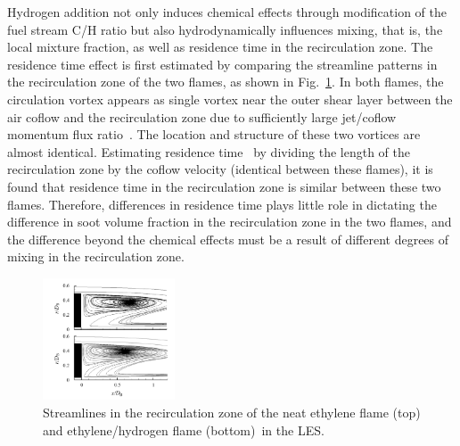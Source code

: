 \documentclass[review,3p,times]{elsarticle}
\begin{document}
  
Hydrogen addition not only induces chemical effects through modification of the fuel stream C/H ratio but also hydrodynamically influences mixing, that is, the local mixture fraction, as well as residence time in the recirculation zone.  The residence time effect is first estimated by comparing the streamline patterns in the recirculation zone of the two flames, as shown in Fig.~\ref{fig:streamline}.  In both flames, the circulation vortex appears as single vortex near the outer shear layer between the air coflow and the recirculation zone due to sufficiently large jet/coflow momentum flux ratio~\cite{dally98a,dally98b}.  The location and structure of these two vortices are almost identical.  Estimating residence time~\cite{dally96} by dividing the length of the recirculation zone by the coflow velocity (identical between these flames), it is found that residence time in the recirculation zone is similar between these two flames.  Therefore, differences in residence time plays little role in dictating the difference in soot volume fraction in the recirculation zone in the two flames, and the difference beyond the chemical effects must be a result of different degrees of mixing in the recirculation zone.

\begin{figure}[t]
  \centering
  \scriptsize
  \vspace{-0.10in}
  \includegraphics[trim=12.0mm 2.0mm 8mm 5mm, clip=true, width=0.35\textwidth]{streamline.png}
  \normalsize
  \vspace{-0.1in}
  \caption{Streamlines in the recirculation zone of the neat ethylene flame (top) and ethylene/hydrogen flame (bottom)~\textcolor{Rv1}{in the LES}.}
  \label{fig:streamline}
\end{figure}
\end{document}

